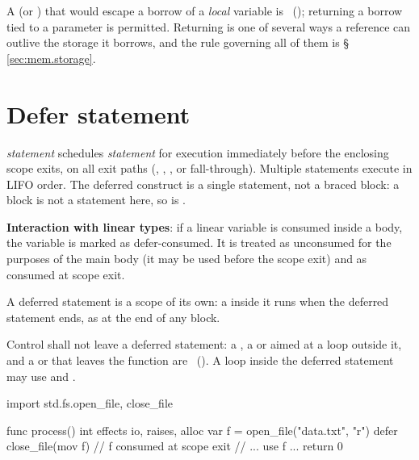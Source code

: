 \begin{constraint}
  A  (or ) that would escape a borrow of a \emph{local}
  variable is \illformed{}~(); returning a  borrow tied to a
   parameter is permitted.  Returning is one of several ways a reference can outlive
  the storage it borrows, and the rule governing all of them is
  \S\,\ref{sec:mem.storage}.
\end{constraint}

\section{Defer statement}
\label{sec:stmt.defer}

\pnum
{} \textit{statement} schedules \textit{statement} for execution immediately
before the enclosing scope exits, on all exit paths (,
, , or fall-through).  Multiple 
statements execute in LIFO order.  The deferred construct is a single statement, not a braced
block: a block is not a statement here, so  is \illformed{}.

\pnum
\textbf{Interaction with linear types}: if a linear variable is consumed
inside a  body, the variable is marked as defer-consumed.  It
is treated as unconsumed for the purposes of the main body (it may be used
before the scope exit) and as consumed at scope exit.

\pnum
A deferred statement is a scope of its own: a  inside it runs
when the deferred statement ends, as at the end of any block.

\begin{constraint}
  Control shall not leave a deferred statement: a , a
   or  aimed at a loop outside it, and a
   or  that leaves the function are
  \illformed{}~().  A loop inside the deferred statement may
  use  and .
\end{constraint}

\begin{example}
\begin{laincode}
import std.fs.{open_file, close_file}

func process() int effects io, raises, alloc {
    var f = open_file("data.txt", "r")
    defer close_file(mov f)       // f consumed at scope exit
    // ... use f ...
    return 0
}
\end{laincode}
\end{example}


